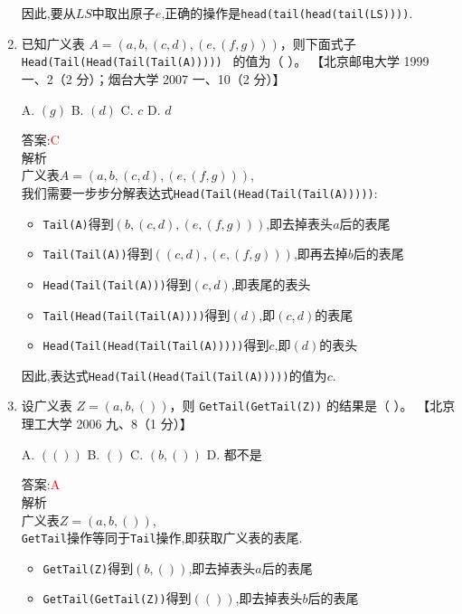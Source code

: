 \documentclass[lang=cn,newtx,10pt,scheme=chinese]{../elegantbook}
\begin{document}
\begin{enumerate}
    因此,要从$LS$中取出原子$e$,正确的操作是\texttt{head(tail(head(tail(LS))))}.\\
   

    \item 已知广义表 $A = (a, b, (c, d), (e, (f, g)))$，则下面式子 \texttt{Head(Tail(Head(Tail(Tail(A))))) } 的值为（ ）。  
    【北京邮电大学 1999 一、2（2 分）；烟台大学 2007 一、10（2 分）】

    A. $(g)$ \quad B. $(d)$ \quad C. $c$ \quad D. $d$  

    答案:\textcolor{red}{C}\\
    解析\\
    广义表$A = (a, b, (c, d), (e, (f, g)))$,\\
    我们需要一步步分解表达式\texttt{Head(Tail(Head(Tail(Tail(A)))))}: 
    \begin{itemize}
        \item \texttt{Tail(A)}得到$(b, (c, d), (e, (f, g)))$,即去掉表头$a$后的表尾
        \item \texttt{Tail(Tail(A))}得到$((c, d), (e, (f, g)))$,即再去掉$b$后的表尾
        \item \texttt{Head(Tail(Tail(A)))}得到$(c, d)$,即表尾的表头
        \item \texttt{Tail(Head(Tail(Tail(A))))}得到$(d)$,即$(c, d)$的表尾
        \item \texttt{Head(Tail(Head(Tail(Tail(A)))))}得到$c$,即$(d)$的表头
    \end{itemize}
    
    因此,表达式\texttt{Head(Tail(Head(Tail(Tail(A)))))}的值为$c$.\\

    \item 设广义表 $Z = (a, b, ())$，则 \texttt{GetTail(GetTail(Z))} 的结果是（ ）。  
    【北京理工大学 2006 九、8（1 分）】  

    A. $(())$ \quad B. $()$ \quad C. $(b, ())$ \quad D. 都不是  

    答案:\textcolor{red}{A}\\
    解析\\
    广义表$Z = (a, b, ())$,\\
    \texttt{GetTail}操作等同于\texttt{Tail}操作,即获取广义表的表尾.\\
    \begin{itemize}
        \item \texttt{GetTail(Z)}得到$(b, ())$,即去掉表头$a$后的表尾
        \item \texttt{GetTail(GetTail(Z))}得到$(())$,即去掉表头$b$后的表尾
    \end{itemize}
    

\end{enumerate}
\end{document}
